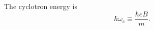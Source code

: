 \documentclass{article}
\begin{document}
The cyclotron energy is
\begin{equation}
\hbar\omega_c \equiv \frac{\hbar e B}{m} .
\label{eq:wc}
\end{equation}
\end{document}
